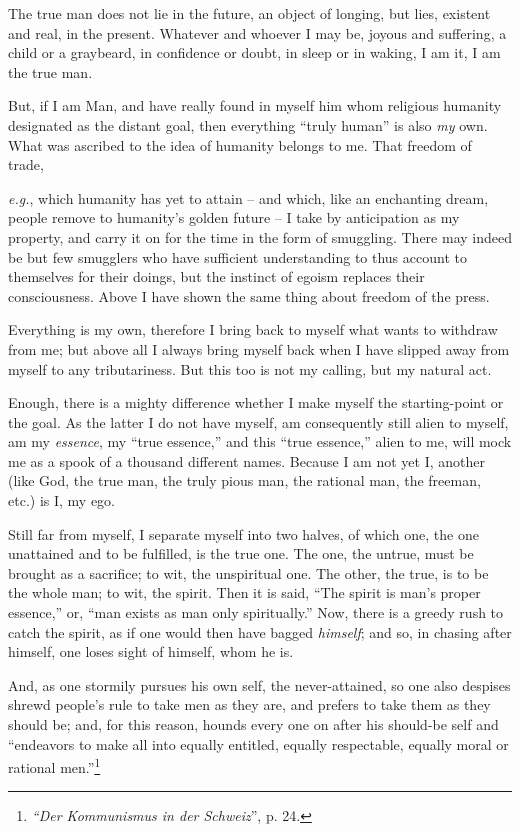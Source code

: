 \documentclass[12pt,a4paper]{book}
\begin{document}
The true man does not lie in the future, an object of longing, but lies, 
existent and real, in the present. Whatever and whoever I may be, joyous and 
suffering, a child or a graybeard, in confidence or doubt, in sleep or in 
waking, I am it, I am the true man.

But, if I am Man, and have really found in myself him whom religious humanity 
designated as the distant goal, then everything ``truly human'' is also 
\textit{my} own. What was ascribed to the idea of humanity belongs to me. That 
freedom of trade,

\textit{e.g.}, which humanity has yet to attain -- and which, like an 
enchanting dream, people remove to humanity's golden future -- I take by 
anticipation as my property, and carry it on for the time in the form of 
smuggling. There may indeed be but few smugglers who have sufficient 
understanding to thus account to themselves for their doings, but the instinct 
of egoism replaces their consciousness. Above I have shown the same thing 
about freedom of the press.

Everything is my own, therefore I bring back to myself what wants to withdraw 
from me; but above all I always bring myself back when I have slipped away 
from myself to any tributariness. But this too is not my calling, but my 
natural act.

Enough, there is a mighty difference whether I make myself the starting-point 
or the goal. As the latter I do not have myself, am consequently still alien 
to myself, am my \textit{essence}, my ``true essence,'' and this ``true 
essence,'' alien to me, will mock me as a spook of a thousand different 
names. Because I am not yet I, another (like God, the true man, the truly 
pious man, the rational man, the freeman, etc.) is I, my ego.

Still far from myself, I separate myself into two halves, of which one, the 
one unattained and to be fulfilled, is the true one. The one, the untrue, must 
be brought as a sacrifice; to wit, the unspiritual one. The other, the true, 
is to be the whole man; to wit, the spirit. Then it is said, ``The spirit is 
man's proper essence,'' or, ``man exists as man only spiritually.'' Now, 
there is a greedy rush to catch the spirit, as if one would then have bagged 
\textit{himself}; and so, in chasing after himself, one loses sight of 
himself, whom he is.

And, as one stormily pursues his own self, the never-attained, so one also 
despises shrewd people's rule to take men as they are, and prefers to take 
them as they should be; and, for this reason, hounds every one on after his 
should-be self and ``endeavors to make all into equally entitled, equally 
respectable, equally moral or rational men.''\footnote{\textit{``Der 
Kommunismus in der Schweiz}'', p. 24.}
\end{document}
